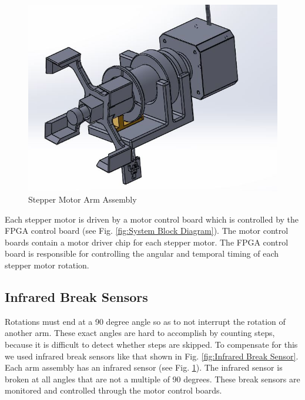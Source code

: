 \documentclass[final, letterpaper, 10 pt, conference, twocolumn]{IEEEtran}
\begin{document}
\begin{figure}[!ht]
\centering
\includegraphics[scale=0.30]{StepperMotorArm.jpg}
\caption{Stepper Motor Arm Assembly}
\label{fig:Stepper Motor Arm}
\end{figure}

Each stepper motor is driven by a motor control board which is controlled by the FPGA control board (see Fig. \ref{fig:System Block Diagram}). The motor control boards contain a motor driver chip for each stepper motor. The FPGA control board is responsible for controlling the angular and temporal timing of each stepper motor rotation.

\subsection{Infrared Break Sensors}
\label{sec:Infrared Break Sensors}
Rotations must end at a 90 degree angle so as to not interrupt the rotation of another arm.  These exact angles are hard to accomplish by counting steps, because it is difficult to detect whether steps are skipped.  To compensate for this we used infrared break sensors like that shown in Fig. \ref{fig:Infrared Break Sensor}. Each arm assembly has an infrared sensor (see Fig. \ref{fig:Stepper Motor Arm}). The infrared sensor is broken at all angles that are not a multiple of 90 degrees. These break sensors are monitored and controlled through the motor control boards.
\end{document}
